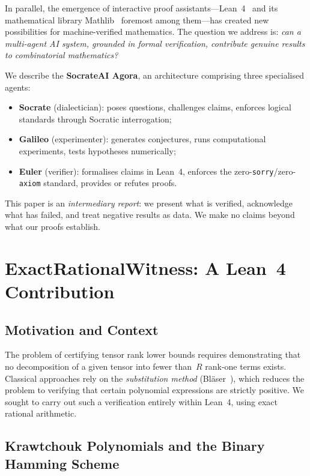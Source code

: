 \documentclass[11pt,a4paper]{article}
\begin{document}
In parallel, the emergence of interactive proof assistants---Lean~4~\cite{demoura2021}
and its mathematical library Mathlib~\cite{mathlib2024} foremost among
them---has created new possibilities for machine-verified mathematics. The
question we address is: \emph{can a multi-agent AI system, grounded in formal
verification, contribute genuine results to combinatorial mathematics?}

We describe the \textbf{SocrateAI Agora}, an architecture comprising three
specialised agents:
\begin{itemize}
  \item \textbf{Socrate} (dialectician): poses questions, challenges claims,
    enforces logical standards through Socratic interrogation;
  \item \textbf{Galileo} (experimenter): generates conjectures, runs
    computational experiments, tests hypotheses numerically;
  \item \textbf{Euler} (verifier): formalises claims in Lean~4, enforces the
    zero-\texttt{sorry}/zero-\texttt{axiom} standard, provides or refutes
    proofs.
\end{itemize}

This paper is an \emph{intermediary report}: we present what is verified,
acknowledge what has failed, and treat negative results as data. We make no
claims beyond what our proofs establish.

\section{ExactRationalWitness: A Lean~4 Contribution}\label{sec:witness}

\subsection{Motivation and Context}

The problem of certifying tensor rank lower bounds requires demonstrating that
no decomposition of a given tensor into fewer than~$R$ rank-one terms exists.
Classical approaches rely on the \emph{substitution method}
(Bläser~\cite{blaser2003}), which reduces the problem to verifying that
certain polynomial expressions are strictly positive. We sought to carry out
such a verification entirely within Lean~4, using exact rational arithmetic.

\subsection{Krawtchouk Polynomials and the Binary Hamming Scheme}
\end{document}
